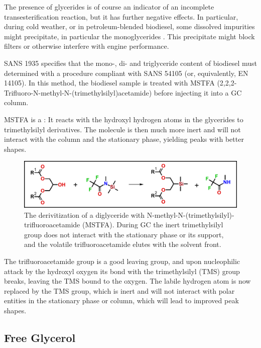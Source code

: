The presence of glycerides is of course an indicator of an incomplete
transesterification reaction, but it has further negative effects. In
particular, during cold weather, or in petroleum-blended biodiesel, some
dissolved impurities might precipitate, in particular the monoglycerides
\autocite{Dunn2009,Plata2015}. This precipitate might block filters or otherwise
interfere with engine performance.

SANS 1935 specifies that the mono-, di- and triglyceride content of biodiesel
must determined with a procedure compliant with SANS 54105 (or, equivalently, EN
14105). In this method, the biodiesel sample is treated with MSTFA
(2,2,2-Trifluoro-N-methyl-N-(trimethylsilyl)acetamide) before injecting it into
a GC column.

MSTFA is a : It reacts with the hydroxyl
hydrogen atoms in the glycerides to trimethylsilyl derivatives. The molecule is
then much more inert and will not interact with the column and the stationary
phase, yielding peaks with better shapes. 

\begin{figure}
\centering
\includegraphics[width=\textwidth]{Figures/Derivitization.pdf}
\decoRule

\caption[Derivitization]{The derivitization of a diglyceride with
N-methyl-N-(trimethylsilyl)-trifluoroacetamide (MSTFA). During GC the inert
trimethylsilyl group does not interact with the stationary phase or its support,
and the volatile trifluoroacetamide elutes with the solvent front.}

\label{fig:MSTFA}
\end{figure}

The trifluoroacetamide group is a good leaving group, and upon nucleophilic
attack by the hydroxyl oxygen its bond with the trimethylsilyl (TMS) group breaks,
leaving the TMS bound to the oxygen. The labile hydrogen atom is now replaced by
the TMS group, which is inert and will not interact with polar entities in the
stationary phase or column, which will lead to improved peak shapes. 

\subsection{Free Glycerol}

